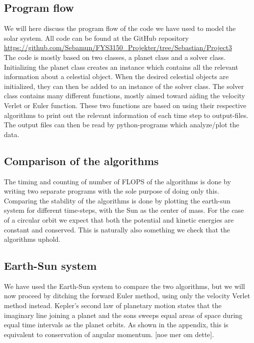 \documentclass{article}
\begin{document}
\begin{multicols}{2}
\subsection{Program flow}

We will here discuss the program flow of the code we have used to model the solar system. All code can be found at the GitHub repository \\
\url{https://github.com/Sebamun/FYS3150_Projekter/tree/Sebastian/Project3}  \\ The code is mostly based on two classes, a planet class and a solver class. Initializing the planet class creates an instance which contains all the relevant information about a celestial object. When the desired celestial objects are initialized, they can then be added to an instance of the solver class. The solver class contains many different functions, mostly aimed toward aiding the velocity Verlet or Euler function. These two functions are based on using their respective algorithms to print out the relevant information of each time step to output-files. The output files can then be read by python-programs which analyze/plot the data.

\subsection{Comparison of the algorithms}
The timing and counting of number of FLOPS of the algorithms is done by writing two separate programs with the sole purpose of doing only this. Comparing the stability of the algorithms is done by plotting the earth-sun system for different time-steps, with the Sun as the center of mass. For the case of a circular orbit we expect that both the potential and kinetic energies are constant and conserved. This is naturally also something we check that the algorithms uphold. 

\subsection{Earth-Sun system}
We have used the Earth-Sun system to compare the two algorithms, but we will now proceed by ditching the forward Euler method, using only the velocity Verlet method instead. Kepler's second law of planetary motion states that the imaginary line joining a planet and the sons sweeps equal areas of space during equal time intervals as the planet orbits. As shown in the appendix, this is equivalent to conservation of angular momentum. [noe mer om dette]. 


\end{multicols}
\end{document}
